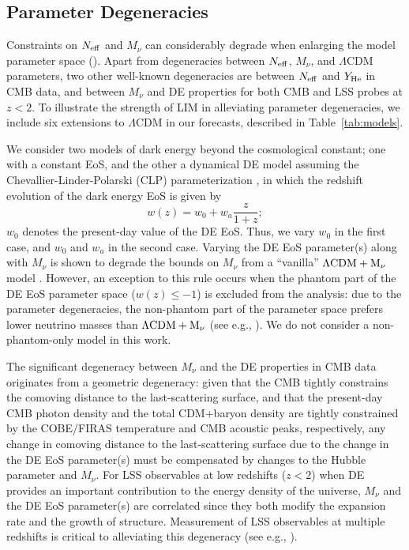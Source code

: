 \documentclass[twocolumn]{aastex631}
\newcommand{\be}{\begin{equation}}
\newcommand{\ee}{\end{equation}}
\begin{document}
\subsection{Parameter Degeneracies}

Constraints on $N_{\rm eff}$ and $M_\nu$ can considerably degrade when enlarging the model parameter space (\citealt{Archidiacono:2016lnv,Boyle:2017lzt,Boyle:2020rxq}). Apart from degeneracies between $N_{\rm eff}$,  $M_\nu$, and $\Lambda$CDM parameters, two other well-known degeneracies are between  $N_{\rm eff}$ and $Y_{\rm He}$ in CMB data, and between $M_\nu$ and DE properties for both CMB and LSS probes at $z < 2$. To illustrate the strength of LIM in alleviating parameter degeneracies, we include six extensions to $\Lambda$CDM in our forecasts, described in Table~\ref{tab:models}. 

We consider two models of dark energy beyond the cosmological constant; one with a constant EoS, and the other a dynamical DE model assuming the Chevallier-Linder-Polarski (CLP) parameterization \citep{Chevallier:2000qy,Linder:2002et}, in which the redshift evolution of the dark energy EoS is given by
\be 
w(z) = w_0 + w_a \frac{z}{1+z};
\ee 
$w_0$ denotes the present-day value of the DE EoS. Thus, we vary $w_0$ in the first case, and $w_0$ and $w_a$ in the second case. Varying the DE EoS parameter(s) along with $M_\nu$ is shown to degrade the bounds on $M_\nu$ from a ``vanilla'' $\Lambda\rm CDM+M_\nu$ model \citep{Hannestad:2005gj,Upadhye:2017hdl,Lorenz:2017fgo,Mishra-Sharma:2018ykh,Brinckmann:2018owf, RoyChoudhury:2019hls}. However, an exception to this rule occurs when the phantom part of the DE EoS parameter space ($w(z) \leq -1$) is excluded from the analysis: due to the parameter degeneracies, the non-phantom part of the parameter space prefers lower neutrino masses than $\Lambda\rm CDM+M_\nu$ (see e.g., \citealt{Vagnozzi:2018jhn, RoyChoudhury:2018vnm}). We do not consider a non-phantom-only model in this work. 

The significant degeneracy between $M_\nu$ and the DE properties in CMB data originates from a geometric degeneracy: given that the CMB tightly constrains the comoving distance to the last-scattering surface, and that the present-day CMB photon density and the total CDM+baryon density are tightly constrained by the COBE/FIRAS temperature and CMB acoustic peaks, respectively, any change in comoving distance to the last-scattering surface due to the change in the DE EoS parameter(s) must be compensated by changes to the Hubble parameter and $M_\nu$. For LSS observables at low redshifts ($z<2$) when DE provides an important contribution to the energy density of the universe, $M_\nu$ and the DE EoS parameter(s) are correlated since they both modify the expansion rate and the growth of structure. Measurement of LSS observables at multiple redshifts is critical to alleviating this degeneracy (see e.g., \citealt{Mishra-Sharma:2018ykh}). 
\end{document}
